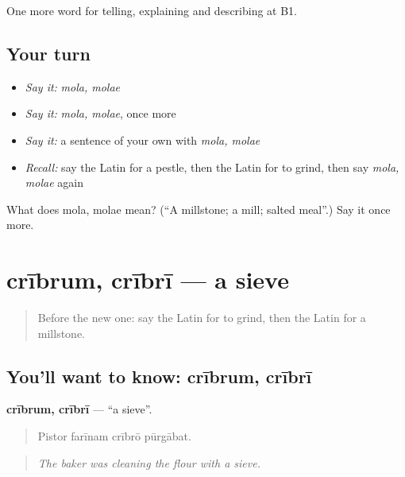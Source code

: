 \begin{grammarlens}[title={What you've built}]
One more word for telling, explaining and describing at B1.
\end{grammarlens}

\subsection*{Your turn}
\begin{itemize}
\raggedright
  \item \emph{Say it:} \emph{mola, molae}
  \item \emph{Say it:} \emph{mola, molae}, once more
  \item \emph{Say it:} a sentence of your own with \emph{mola, molae}
  \item \emph{Recall:} say the Latin for a pestle, then the Latin for to grind, then say \emph{mola, molae} again
\end{itemize}

\begin{tcolorbox}[breakable,colback=teal!4,colframe=teal!35!black,title={Before you move on}]
What does mola, molae mean? (\textquotedblleft{}A millstone; a mill; salted meal\textquotedblright{}.) Say it once more.
\end{tcolorbox}
\section[crībrum, crībrī]{crībrum, crībrī — a sieve}

\label{lesson:LA-C352-cribrum}



\begin{quote}
Before the new one: say the Latin for to grind, then the Latin for a millstone.
\end{quote}

\subsection*{You'll want to know: crībrum, crībrī}
\textbf{crībrum, crībrī} — \textquotedblleft{}a sieve\textquotedblright{}.

\begin{quote}
Pistor farīnam crībrō pūrgābat.
\end{quote}

\begin{quote}
\emph{The baker was cleaning the flour with a sieve.}
\end{quote}

